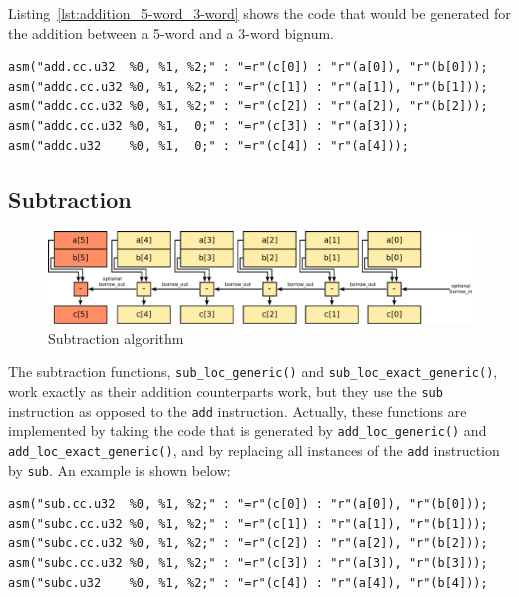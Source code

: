 \documentclass[12pt, a4paper]{report}
\begin{document}
\begin{sloppypar}
Listing~\ref{lst:addition_5-word_3-word} shows the code that would be generated
for the addition between a 5-word and a 3-word bignum.

\begin{lstlisting}
asm("add.cc.u32  %0, %1, %2;" : "=r"(c[0]) : "r"(a[0]), "r"(b[0]));
asm("addc.cc.u32 %0, %1, %2;" : "=r"(c[1]) : "r"(a[1]), "r"(b[1]));
asm("addc.cc.u32 %0, %1, %2;" : "=r"(c[2]) : "r"(a[2]), "r"(b[2]));
asm("addc.cc.u32 %0, %1,  0;" : "=r"(c[3]) : "r"(a[3]));
asm("addc.u32    %0, %1,  0;" : "=r"(c[4]) : "r"(a[4]));
\end{lstlisting}

\subsection{Subtraction}
\begin{figure}[h]
\centering
\includegraphics[width=\linewidth]{figs/subtraction}
\caption{Subtraction algorithm}
\label{fig:subtraction}
\end{figure}

The subtraction functions, \verb+sub_loc_generic()+ and
\verb+sub_loc_exact_generic()+, work exactly as their addition counterparts
work, but they use the \verb+sub+ instruction as opposed to the \verb+add+
instruction.
Actually, these functions are implemented by taking the code that is generated
by \verb+add_loc_generic()+ and \verb+add_loc_exact_generic()+, and by replacing
all instances of the \verb+add+ instruction by \verb+sub+.
An example is shown below:

\begin{lstlisting}
asm("sub.cc.u32  %0, %1, %2;" : "=r"(c[0]) : "r"(a[0]), "r"(b[0]));
asm("subc.cc.u32 %0, %1, %2;" : "=r"(c[1]) : "r"(a[1]), "r"(b[1]));
asm("subc.cc.u32 %0, %1, %2;" : "=r"(c[2]) : "r"(a[2]), "r"(b[2]));
asm("subc.cc.u32 %0, %1, %2;" : "=r"(c[3]) : "r"(a[3]), "r"(b[3]));
asm("subc.u32    %0, %1, %2;" : "=r"(c[4]) : "r"(a[4]), "r"(b[4]));
\end{lstlisting}


\end{sloppypar}
\end{document}
